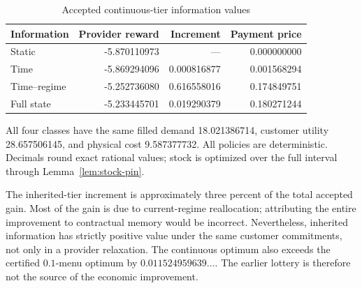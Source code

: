 \documentclass[11pt,letterpaper]{article}
\theoremstyle{definition}
\newcommand{\1}{\mathbf 1}
\begin{document}
\begin{table}[!ht]
\centering
\caption{Accepted continuous-tier information values}\label{tab:accepted-hierarchy}
\begin{tabular}{lrrr}\toprule
Information & Provider reward & Increment & Payment price\\
\midrule
Static & -5.870110973 & --- & 0.000000000\\
Time & -5.869294096 & 0.000816877 & 0.001568294\\
Time--regime & -5.252736080 & 0.616558016 & 0.174849751\\
Full state & -5.233445701 & 0.019290379 & 0.180271244\\
\bottomrule\end{tabular}
\par\smallskip\begin{minipage}{.98\textwidth}\small All four classes have the same filled demand 18.021386714, customer utility 28.657506145, and physical cost 9.587377732. All policies are deterministic. Decimals round exact rational values; stock is optimized over the full interval through Lemma~\ref{lem:stock-pin}.\end{minipage}
\end{table}

The inherited-tier increment is approximately three percent of the total accepted gain. Most of the gain is due to current-regime reallocation; attributing the entire improvement to contractual memory would be incorrect. Nevertheless, inherited information has strictly positive value under the same customer commitments, not only in a provider relaxation. The continuous optimum also exceeds the certified $0.1$-menu optimum by $0.011524959639\ldots$. The earlier lottery is therefore not the source of the economic improvement.
\end{document}
